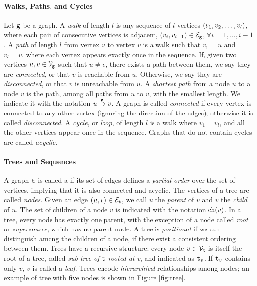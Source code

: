 \paragraph{Walks, Paths, and Cycles}
Let $\mathtt{g}$ be a graph. A \emph{walk} of length $l$ is any sequence of $l$ vertices $\left( v_1, v_2, \ldots, v_l \right)$, where each pair of consecutive vertices is adjacent, \ie $\Par{v_i, v_{i+1}} \in \Edges{g}$, $\forall i= 1, \ldots, i-1$. A \emph{path} of length $l$ from vertex $u$ to vertex $v$ is a walk such that $v_1 = u$ and $v_l = v$, where each vertex appears exactly once in the sequence. If, given two vertices $u, v \in \Nodes{g}$ such that $u \neq v$, there exists a path between them, we say they are \emph{connected}, or that $v$ is reachable from $u$. Otherwise, we say they are \emph{disconnected}, or that $v$ is unreachable from $u$. A \emph{shortest path} from a node $u$ to a node $v$ is the path, among all paths from $u$ to $v$, with the smallest length. We indicate it with the notation $u \xrightarrow[]{\mathtt{g}} v$. A graph is called \emph{connected} if every vertex is connected to any other vertex (ignoring the direction of the edges); otherwise it is called \emph{disconnected}. A \emph{cycle}, or \emph{loop}, of length $l$ is a walk where $v_1 = v_l$, and all the other vertices appear once in the sequence. Graphs that do not contain cycles are called \emph{acyclic}.

\paragraph{Trees and Sequences}
A graph $\mathtt{t}$ is called a  if its set of edges defines a \emph{partial order} over the set of vertices, implying that it is also connected and acyclic. The vertices of a tree are called \emph{nodes}. Given an edge $(u, v) \in \Edges{t}$, we call $u$ the \emph{parent} of $v$ and $v$ the \emph{child} of $u$. The set of children of a node $v$ is indicated with the notation $\mathrm{ch}(v)$. In a tree, every node has exactly one parent, with the exception of a node called \emph{root} or \emph{supersource}, which has no parent node. A tree is \emph{positional} if we can distinguish among the children of a node, \ie if there exist a consistent ordering between them. Trees have a recursive structure: every node $v \in \Nodes{t}$ is itself the root of a tree, called \emph{sub-tree of} $\mathtt{t}$ \emph{rooted at v}, and indicated as $\mathtt{t}_v$. If $\mathtt{t}_v$ contains only $v$, $v$ is called a \emph{leaf}. Trees encode \emph{hierarchical} relationships among nodes; an example of tree with five nodes is shown in Figure \ref{fig:tree}.

